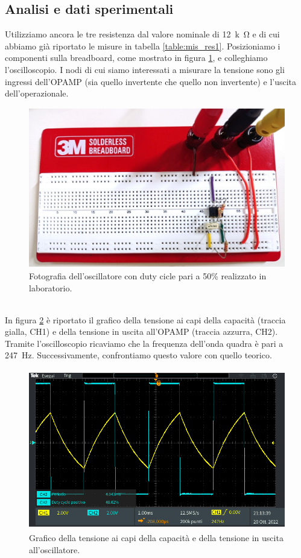\documentclass{report}
\begin{document}
\subsection{Analisi e dati sperimentali}
Utilizziamo ancora le tre resistenza dal valore nominale di \SI{12}{k\ohm} e di cui abbiamo già riportato le misure in tabella \ref{table:mis_res1}. Posizioniamo i componenti sulla breadboard, come mostrato in figura \ref{figura:circuito3}, e colleghiamo l'oscilloscopio. I nodi di cui siamo interessati a misurare la tensione sono gli ingressi dell'OPAMP (sia quello invertente che quello non invertente) e l'uscita dell'operazionale.
\begin{figure}[h!]
	\centering
	\includegraphics[height=7cm]{immagini/circuito3}
	\caption{Fotografia dell'oscillatore con duty cicle pari a 50\% realizzato in laboratorio.}
	\label{figura:circuito3}
\end{figure}
\\In figura \ref{figura:oscillo1} è riportato il grafico della tensione ai capi della capacità (traccia gialla, CH1) e della tensione in uscita all'OPAMP (traccia azzurra, CH2). Tramite l'oscilloscopio ricaviamo che la frequenza dell'onda quadra è pari a \SI{247}{\hertz}. Successivamente, confrontiamo questo valore con quello teorico.
\begin{figure}[h!]
	\centering
	\includegraphics[height=7cm]{immagini/TEK00025}
	\caption{Grafico della tensione ai capi della capacità e della tensione in uscita all'oscillatore.}
	\label{figura:oscillo1}
\end{figure}
\end{document}
